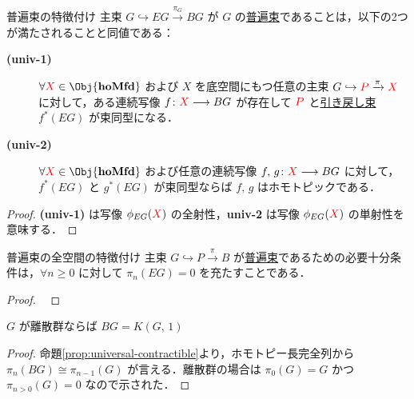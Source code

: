 \documentclass[TQFT_main]{subfiles}
\begin{document}
\begin{myprop}[label=prop:universal-basic]{普遍束の特徴付け}
    主束 $G \hookrightarrow EG \xrightarrow{\pi_G} BG$ が $G$ の\hyperref[def:universal-bundle]{普遍束}であることは，以下の2つが満たされることと同値である：
    \begin{description}
        \item[\textbf{(univ-1)}]  $\forall \textcolor{red}{X} \in \Obj{\bm{\mathrm{hoMfd}}}$ および $X$ を底空間にもつ任意の主束 $G \hookrightarrow \textcolor{red}{P} \xrightarrow{\pi} \textcolor{red}{X}$ に対して，ある連続写像 $f \colon \textcolor{red}{X} \longrightarrow BG$ が存在して
        $\textcolor{red}{P}$ と\hyperref[def:pullback-bundle]{引き戻し束} $f^*(EG)$ が束同型になる．
        \item[\textbf{(univ-2)}]  $\forall \textcolor{red}{X} \in \Obj{\bm{\mathrm{hoMfd}}}$ および任意の連続写像 $f,\, g \colon \textcolor{red}{X} \longrightarrow BG$ に対して，
        $f^*(EG)$ と $g^*(EG)$ が束同型ならば $f,\, g$ はホモトピックである．
    \end{description}
\end{myprop}

\begin{proof}
    \textsf{\textbf{(univ-1)}} は写像 $\phi_{EG}(\textcolor{red}{X})$ の全射性，\textsf{\textbf{univ-2}} は写像 $\phi_{EG}(\textcolor{red}{X})$ の単射性を意味する．
\end{proof}

\begin{myprop}[label=prop:universal-contractible]{普遍束の全空間の特徴付け}
    主束 $G \hookrightarrow P \xrightarrow{\pi} B$ が\hyperref[def:universal-bundle]{普遍束}であるための必要十分条件は，$\forall n \ge 0$ に対して $\pi_n(EG) = 0$ を充たすことである．
\end{myprop}

\begin{proof}
    ~\cite[p.102, 19.4]{Steenrod1951}
\end{proof}

\begin{myprop}[label=prop:classifying-space-Kpi1]{}
    $G$ が離散群ならば $BG = K(G,\, 1)$
\end{myprop}

\begin{proof}
    命題\ref{prop:universal-contractible}より，ホモトピー長完全列から $\pi_n(BG) \cong \pi_{n-1}(G)$ が言える．離散群の場合は $\pi_0(G) = G$ かつ $\pi_{n>0}(G) = 0$ なので示された．
\end{proof}
\end{document}
